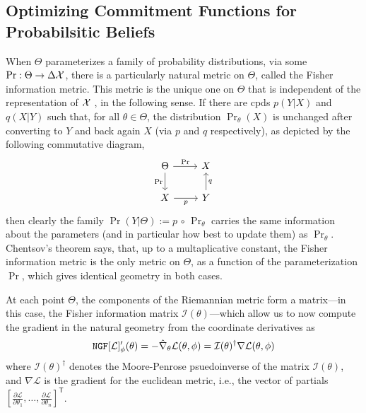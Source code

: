 \subsection{Optimizing Commitment Functions for Probabilsitic Beliefs}
When $\Theta$ parameterizes a family of probability distributions, via some $\Pr : \Theta \to \Delta \mathcal X$, there is a particularly natural metric on $\Theta$, called the Fisher information metric.
This metric is the unique one on $\Theta$ that is
independent of the representation of $\mathcal X$ \parencite{chentsov}, in the following sense.
If there are cpds $p(Y|X)$ and $q(X|Y)$ such that, for all $\theta \in \Theta$,
the distribution $\Pr_{\theta}(X)$ is unchanged after converting to $Y$ and back again $X$ (via $p$ and $q$ respectively), as depicted by the following commutative diagram,
\[
	\begin{tikzcd}
		\Theta \ar[r,"\Pr"]\ar[d,"\Pr"']
			& X \\
		X \ar[r,"p"'] & Y \ar[u, "q"']
	\end{tikzcd}
\]
then clearly the family $\Pr(Y|\Theta) := p\,\circ\,\Pr_{\theta}$ carries the same information about the parameters (and in particular how best to update them) as $\Pr_\theta$.
Chentsov's theorem says, that, up to a multaplicative constant, the Fisher information metric is the only metric on $\Theta$, as a function of the parameterization $\Pr$, which gives identical geometry in both cases.


At each point $\Theta$, the components of the Riemannian metric form a matrix---in this case, the Fisher information matrix $\mathcal I(\theta)$---which allow us to now compute the gradient in the natural geometry from the coordinate derivatives as
\[
	\mathtt{NGF}[\cal L]'_\phi (\theta) = - \hat \nabla_\theta \mathcal L(\theta,\phi)
		= \mathcal I(\theta)^{\dagger}  \nabla \mathcal L(\theta, \phi)
\]
where $ \mathcal I(\theta)^{\dagger} $ denotes the Moore-Penrose psuedoinverse of the matrix $ \mathcal I(\theta)$,
and $\nabla \mathcal L$ is the gradient for the euclidean metric, i.e., the vector of partials $[\frac{\partial \mathcal L}{\partial \theta_1}, %
 \ldots, \frac{\partial \mathcal L}{\partial \theta_n}]^{\mathsf T}$.



